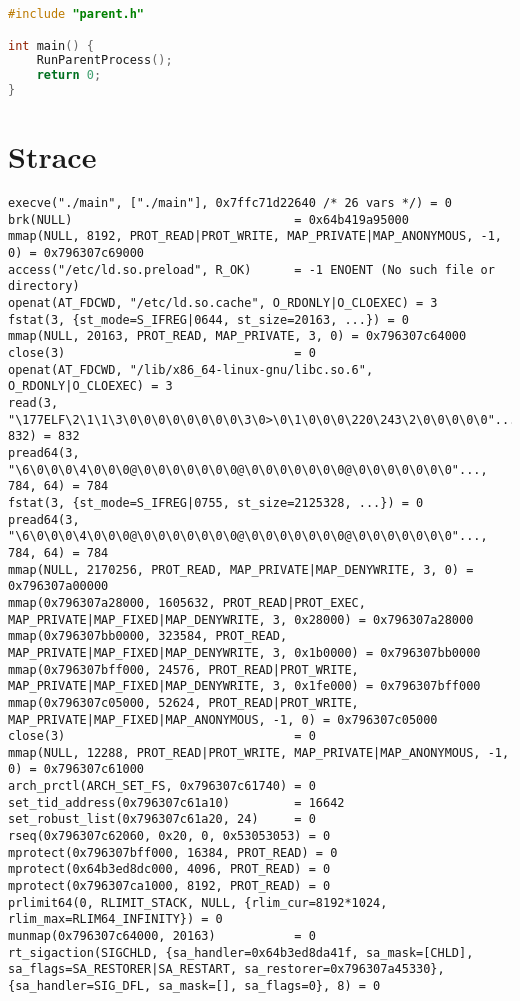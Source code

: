 \begin{lstlisting}[language=C++,caption=main.cpp,captionpos=b]
#include "parent.h"

int main() {
    RunParentProcess();
    return 0;
}
\end{lstlisting}
\section{Strace}
\begin{verbatim}
execve("./main", ["./main"], 0x7ffc71d22640 /* 26 vars */) = 0
brk(NULL)                               = 0x64b419a95000
mmap(NULL, 8192, PROT_READ|PROT_WRITE, MAP_PRIVATE|MAP_ANONYMOUS, -1, 0) = 0x796307c69000
access("/etc/ld.so.preload", R_OK)      = -1 ENOENT (No such file or directory)
openat(AT_FDCWD, "/etc/ld.so.cache", O_RDONLY|O_CLOEXEC) = 3
fstat(3, {st_mode=S_IFREG|0644, st_size=20163, ...}) = 0
mmap(NULL, 20163, PROT_READ, MAP_PRIVATE, 3, 0) = 0x796307c64000
close(3)                                = 0
openat(AT_FDCWD, "/lib/x86_64-linux-gnu/libc.so.6", O_RDONLY|O_CLOEXEC) = 3
read(3, "\177ELF\2\1\1\3\0\0\0\0\0\0\0\0\3\0>\0\1\0\0\0\220\243\2\0\0\0\0\0"..., 832) = 832
pread64(3, "\6\0\0\0\4\0\0\0@\0\0\0\0\0\0\0@\0\0\0\0\0\0\0@\0\0\0\0\0\0\0"..., 784, 64) = 784
fstat(3, {st_mode=S_IFREG|0755, st_size=2125328, ...}) = 0
pread64(3, "\6\0\0\0\4\0\0\0@\0\0\0\0\0\0\0@\0\0\0\0\0\0\0@\0\0\0\0\0\0\0"..., 784, 64) = 784
mmap(NULL, 2170256, PROT_READ, MAP_PRIVATE|MAP_DENYWRITE, 3, 0) = 0x796307a00000
mmap(0x796307a28000, 1605632, PROT_READ|PROT_EXEC, MAP_PRIVATE|MAP_FIXED|MAP_DENYWRITE, 3, 0x28000) = 0x796307a28000
mmap(0x796307bb0000, 323584, PROT_READ, MAP_PRIVATE|MAP_FIXED|MAP_DENYWRITE, 3, 0x1b0000) = 0x796307bb0000
mmap(0x796307bff000, 24576, PROT_READ|PROT_WRITE, MAP_PRIVATE|MAP_FIXED|MAP_DENYWRITE, 3, 0x1fe000) = 0x796307bff000
mmap(0x796307c05000, 52624, PROT_READ|PROT_WRITE, MAP_PRIVATE|MAP_FIXED|MAP_ANONYMOUS, -1, 0) = 0x796307c05000
close(3)                                = 0
mmap(NULL, 12288, PROT_READ|PROT_WRITE, MAP_PRIVATE|MAP_ANONYMOUS, -1, 0) = 0x796307c61000
arch_prctl(ARCH_SET_FS, 0x796307c61740) = 0
set_tid_address(0x796307c61a10)         = 16642
set_robust_list(0x796307c61a20, 24)     = 0
rseq(0x796307c62060, 0x20, 0, 0x53053053) = 0
mprotect(0x796307bff000, 16384, PROT_READ) = 0
mprotect(0x64b3ed8dc000, 4096, PROT_READ) = 0
mprotect(0x796307ca1000, 8192, PROT_READ) = 0
prlimit64(0, RLIMIT_STACK, NULL, {rlim_cur=8192*1024, rlim_max=RLIM64_INFINITY}) = 0
munmap(0x796307c64000, 20163)           = 0
rt_sigaction(SIGCHLD, {sa_handler=0x64b3ed8da41f, sa_mask=[CHLD], sa_flags=SA_RESTORER|SA_RESTART, sa_restorer=0x796307a45330}, {sa_handler=SIG_DFL, sa_mask=[], sa_flags=0}, 8) = 0

\end{verbatim}
